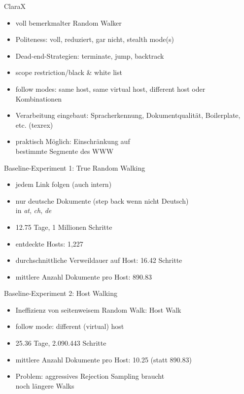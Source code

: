 \begin{frame}
  {ClaraX}
  \begin{itemize}
    \item voll bemerkmalter Random Walker
    \item Politeness: voll, reduziert, gar nicht, stealth mode(s)
    \item Dead-end-Strategien: terminate, jump, backtrack
    \item scope restriction\slash black \& white list
    \item follow modes: same host, same virtual host, different host oder Kombinationen
    \item Verarbeitung eingebaut: Spracherkennung, Dokumentqualität, Boilerplate, etc. (texrex)
    \item praktisch Möglich: Einschränkung auf\\
      bestimmte \alert{Segmente} des WWW
  \end{itemize}
\end{frame}

\begin{frame}
  {Baseline-Experiment 1: True Random Walking}
  \begin{itemize}
    \item jedem Link folgen (auch intern)
    \item nur deutsche Dokumente (step back wenn nicht Deutsch)\\
      in \textit{at}, \textit{ch}, \textit{de}
    \item 12.75 Tage, 1 Millionen Schritte
    \item entdeckte Hosts: \alert{1,227}
    \item durchschnittliche Verweildauer auf Host: \alert{16.42} Schritte
    \item mittlere Anzahl Dokumente pro Host: \alert{890.83}
  \end{itemize}
\end{frame}

\begin{frame}
  {Baseline-Experiment 2: Host Walking}
  \begin{itemize}
    \item Ineffizienz von seitenweisem Random Walk: \alert{Host Walk}
    \item follow mode: different (virtual) host
    \item 25.36 Tage, 2.090.443 Schritte
    \item mittlere Anzahl Dokumente pro Host: \alert{10.25} (statt 890.83)
    \item Problem: aggressives Rejection Sampling braucht\\
      noch längere Walks
  \end{itemize}
\end{frame}

